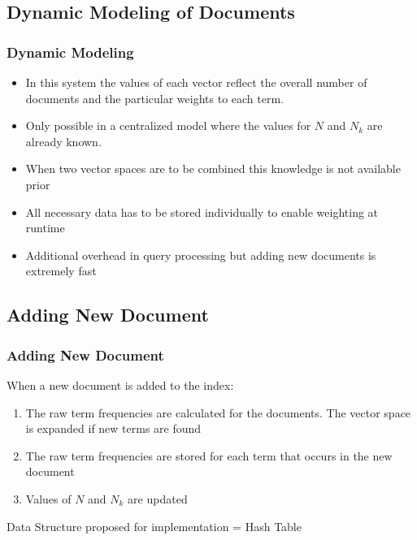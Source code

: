 \documentclass[12pt,xcolor=dvipsnames]{beamer}
\begin{document}
\subsection{Dynamic Modeling of Documents}
\begin{frame}
\frametitle{Dynamic Modeling}
 \begin{itemize}
	\item In this system the values of each vector reflect the overall number of documents and the particular weights to each term.
	\item Only possible in a centralized model where the values for $N$ and $N_{k}$ are already known.
	\item When two vector spaces are to be combined this knowledge is not available prior
	\item All necessary data has to be stored individually to enable weighting at runtime
	\item Additional overhead in query processing but adding new documents is extremely fast
 \end{itemize}
\end{frame}

\subsection{Adding New Document}
\begin{frame}
 \frametitle{Adding New Document}
 When a new document is added to the index:
 \begin{enumerate}
	\item The raw term frequencies are calculated for the documents. The vector space is expanded if new terms are found
	\item The raw term frequencies are stored for each term that occurs in the new document
	\item Values of $N$ and $N_{k}$ are updated
 \end{enumerate}
 Data Structure proposed for implementation = Hash Table
\end{frame}
\end{document}
